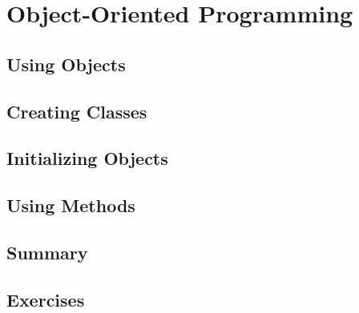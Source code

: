 \chapter{Object-Oriented Programming}

\section{Using Objects}


\section{Creating Classes}


\section{Initializing Objects}


\section{Using Methods}



\section{Summary}


\section{Exercises}






